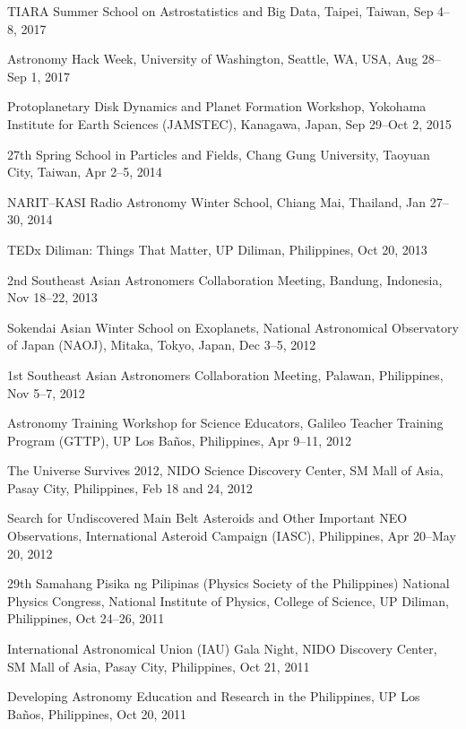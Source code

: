 \documentclass[12pt,letterpaper]{article}
\begin{document}
\begin{list}{}{\cvlist}
    \item TIARA Summer School on Astrostatistics and Big Data, Taipei, Taiwan, Sep 4--8, 2017
    \item Astronomy Hack Week, University of Washington, Seattle, WA, USA, Aug 28--Sep 1, 2017
    \item Protoplanetary Disk Dynamics and Planet Formation Workshop, Yokohama Institute for Earth Sciences (JAMSTEC), Kanagawa, Japan, Sep 29--Oct 2, 2015
    \item 27th Spring School in Particles and Fields, Chang Gung University, Taoyuan City, Taiwan, Apr 2--5, 2014
    \item NARIT--KASI Radio Astronomy Winter School, Chiang Mai, Thailand, Jan 27--30, 2014
    \item TEDx Diliman: Things That Matter, UP Diliman, Philippines, Oct 20, 2013
    \item 2nd Southeast Asian Astronomers Collaboration Meeting, Bandung, Indonesia, Nov 18--22, 2013
    \item Sokendai Asian Winter School on Exoplanets, National Astronomical Observatory of Japan (NAOJ), Mitaka, Tokyo, Japan, Dec 3--5, 2012
    \item 1st Southeast Asian Astronomers Collaboration Meeting, Palawan, Philippines, Nov 5--7, 2012
    \item Astronomy Training Workshop for Science Educators, Galileo Teacher Training Program (GTTP), UP Los Ba\~nos, Philippines, Apr 9--11, 2012
    \item The Universe Survives 2012, NIDO Science Discovery Center, SM Mall of Asia, Pasay City, Philippines, Feb 18 and 24, 2012
    \item Search for Undiscovered Main Belt Asteroids and Other Important NEO Observations, International Asteroid Campaign (IASC), Philippines, Apr 20--May 20, 2012
    \item 29th Samahang Pisika ng Pilipinas (Physics Society of the Philippines) National Physics Congress, National Institute of Physics, College of Science, UP Diliman, Philippines, Oct 24--26, 2011
    \item International Astronomical Union (IAU) Gala Night, NIDO Discovery Center, SM Mall of Asia, Pasay City, Philippines, Oct 21, 2011
    \item Developing Astronomy Education and Research in the Philippines, UP Los Ba\~nos, Philippines, Oct 20, 2011
\end{list}
\end{document}
